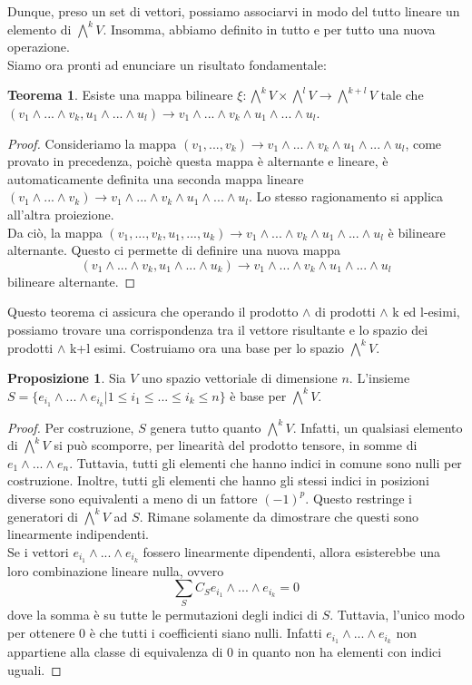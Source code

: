 \documentclass[12pt,a4paper]{report}
\theoremstyle{definition}
\theoremstyle{Theorem}
\newtheorem{Theo}[Def]{Teorema}
\newtheorem{Prop}[Def]{Proposizione}
\theoremstyle{definition}
\theoremstyle{definition}
\theoremstyle{definition}
\begin{document}
Dunque, preso un set di vettori, possiamo associarvi in modo del tutto lineare un elemento di $\bigwedge^kV$. Insomma, abbiamo definito in tutto e per tutto una nuova operazione.\\
Siamo ora pronti ad enunciare un risultato fondamentale:
\begin{Theo} \label{Theo 3}
	Esiste una mappa bilineare $\xi:\bigwedge^kV\times\bigwedge^lV\rightarrow\bigwedge^{k+l}V$ tale che $(v_1\wedge...\wedge v_k,u_1\wedge...\wedge u_l)\longrightarrow v_1\wedge...\wedge v_k\wedge u_1\wedge...\wedge u_l $.
\end{Theo}
\begin{proof}
	Consideriamo la mappa $(v_1,..., v_k)\longrightarrow v_1\wedge...\wedge v_k\wedge u_1\wedge...\wedge u_l$, come provato in precedenza, poichè questa mappa è alternante e lineare, è automaticamente definita una seconda mappa lineare $(v_1\wedge...\wedge v_k)\longrightarrow v_1\wedge...\wedge v_k\wedge u_1\wedge...\wedge u_l$. Lo stesso ragionamento si applica all'altra proiezione.\\
	Da ciò, la mappa $(v_1,..., v_k,u_1,...,u_k)\longrightarrow v_1\wedge...\wedge v_k\wedge u_1\wedge...\wedge u_l$ è bilineare alternante. Questo ci permette di definire una nuova mappa
	$$(v_1\wedge...\wedge v_k,u_1\wedge...\wedge u_k)\longrightarrow v_1\wedge...\wedge v_k\wedge u_1\wedge...\wedge u_l$$ bilineare alternante.
\end{proof}
Questo teorema ci assicura che operando il prodotto $\wedge$ di prodotti $\wedge$ k ed l-esimi, possiamo trovare una corrispondenza tra il vettore risultante e lo spazio dei prodotti $\wedge$ k+l esimi.
Costruiamo ora una base per lo spazio $\bigwedge^kV$.
\begin{Prop}
	Sia $V$ uno spazio vettoriale di dimensione $n$. L'insieme $S=\{e_{i_1}\wedge...\wedge e_{i_k}|1\leq i_1\le...\le i_k\leq n \}$ è base per $\bigwedge^kV$.
\end{Prop}
\begin{proof}
	Per costruzione, $S$ genera tutto quanto $\bigwedge^kV$. Infatti, un qualsiasi elemento di $\bigwedge^kV$ si può scomporre, per linearità del prodotto tensore, in somme di $e_1\wedge...\wedge e_n$. Tuttavia, tutti gli elementi che hanno indici in comune sono nulli per costruzione. Inoltre, tutti gli elementi che hanno gli stessi indici in posizioni diverse sono equivalenti a meno di un fattore $(-1)^p$. Questo restringe i generatori di $\bigwedge^kV$ ad $S$. Rimane solamente da dimostrare che questi sono linearmente indipendenti.\\
	Se i vettori $e_{i_1}\wedge...\wedge e_{i_k}$ fossero linearmente dipendenti, allora esisterebbe una loro combinazione lineare nulla, ovvero
	$$\sum_{S}C_Se_{i_1}\wedge...\wedge e_{i_k}=0$$
	dove la somma è su tutte le permutazioni degli indici di $S$. Tuttavia, l'unico modo per ottenere $0$ è che tutti i coefficienti siano nulli. Infatti $e_{i_1}\wedge...\wedge e_{i_k}$ non appartiene alla classe di equivalenza di $0$ in quanto non ha elementi con indici uguali.
	\end{proof}
\end{document}
